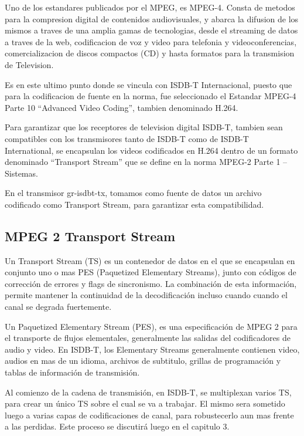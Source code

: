 Uno de los estandares publicados por el MPEG, es MPEG-4. Consta de metodos para la compresion digital de contenidos audiovisuales,  y abarca la difusion de los mismos a traves de una amplia gamas de tecnologias, desde el streaming de datos a traves de la web, codificacion de voz y video para telefonia y videoconferencias, comercializacion de discos compactos (CD) y hasta formatos para la transmision de Television. 

Es en este ultimo punto donde se vincula con ISDB-T Internacional, puesto que para la codificacion de fuente en la norma, fue seleccionado el Estandar MPEG-4 Parte 10 “Advanced Video Coding”, tambien denominado H.264.

Para garantizar que los receptores de television digital ISDB-T, tambien sean compatibles con los transmisores tanto de ISDB-T como de ISDB-T International, se encapsulan los videos codificados en H.264 dentro de un formato denominado “Transport Stream” que se define en la norma MPEG-2 Parte 1 – Sistemas.

En el transmisor gr-isdbt-tx, tomamos como fuente de datos un archivo codificado como Transport Stream, para garantizar esta compatibilidad.

	\subsection{MPEG 2 Transport Stream}
	
	Un Transport Stream (TS) es un contenedor de datos en el que se encapsulan en conjunto uno o mas PES (Paquetized Elementary Streams), junto con códigos de corrección de errores y flags de sincronismo. La combinación de esta información, permite mantener la continuidad de la decodificación incluso cuando cuando el canal se degrada fuertemente.
	
	Un Paquetized Elementary Stream (PES), es una especificación de MPEG 2 para el transporte de flujos elementales, generalmente las salidas del codificadores de audio y video. En ISDB-T, los Elementary Streams generalmente contienen video, audios en mas de un idioma, archivos de subtitulo, grillas de programación y tablas de información de transmisión.
	
	Al comienzo de la cadena de transmisión, en ISDB-T, se multiplexan varios TS, para crear un único TS sobre el cual se va a trabajar. El mismo sera sometido luego a varias capas de codificaciones de canal, para robustecerlo aun mas frente a las perdidas. Este proceso se discutirá luego en el capitulo 3.
	
